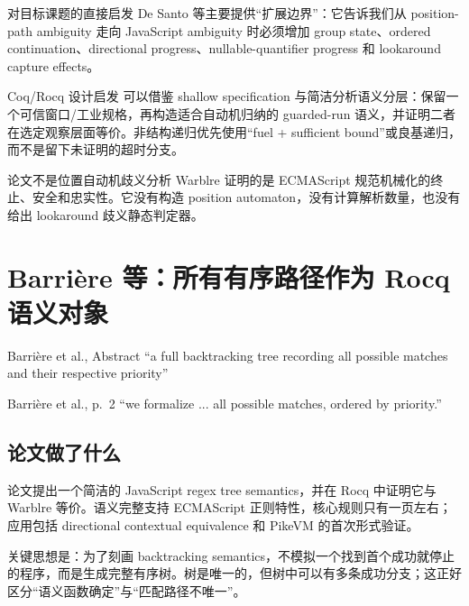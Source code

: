 \documentclass[UTF8,a4paper,12pt]{ctexart}
\begin{document}
\begin{directlink}{对目标课题的直接启发}
De Santo 等主要提供“扩展边界”：它告诉我们从 position-path ambiguity 走向 JavaScript ambiguity 时必须增加 group state、ordered continuation、directional progress、nullable-quantifier progress 和 lookaround capture effects。
\end{directlink}

\begin{coqbox}{Coq/Rocq 设计启发}
可以借鉴 shallow specification 与简洁分析语义分层：保留一个可信窗口/工业规格，再构造适合自动机归纳的 guarded-run 语义，并证明二者在选定观察层面等价。非结构递归优先使用“fuel + sufficient bound”或良基递归，而不是留下未证明的超时分支。
\end{coqbox}

\begin{boundarybox}{论文不是位置自动机歧义分析}
Warblre 证明的是 ECMAScript 规范机械化的终止、安全和忠实性。它没有构造 position automaton，没有计算解析数量，也没有给出 lookaround 歧义静态判定器。
\end{boundarybox}


\section{Barri\`ere 等：所有有序路径作为 Rocq 语义对象}

\begin{paperquote}{Barri\`ere et al., Abstract}
``a full backtracking tree recording all possible matches and their respective priority''
\end{paperquote}

\begin{paperquote}{Barri\`ere et al., p.~2}
``we formalize ... all possible matches, ordered by priority.''
\end{paperquote}

\subsection{论文做了什么}

论文提出一个简洁的 JavaScript regex tree semantics，并在 Rocq 中证明它与 Warblre 等价。语义完整支持 ECMAScript 正则特性，核心规则只有一页左右；应用包括 directional contextual equivalence 和 PikeVM 的首次形式验证\cite[pp.~1--3]{barriere2026}。

关键思想是：为了刻画 backtracking semantics，不模拟一个找到首个成功就停止的程序，而是生成完整有序树。树是唯一的，但树中可以有多条成功分支；这正好区分“语义函数确定”与“匹配路径不唯一”。
\end{document}
